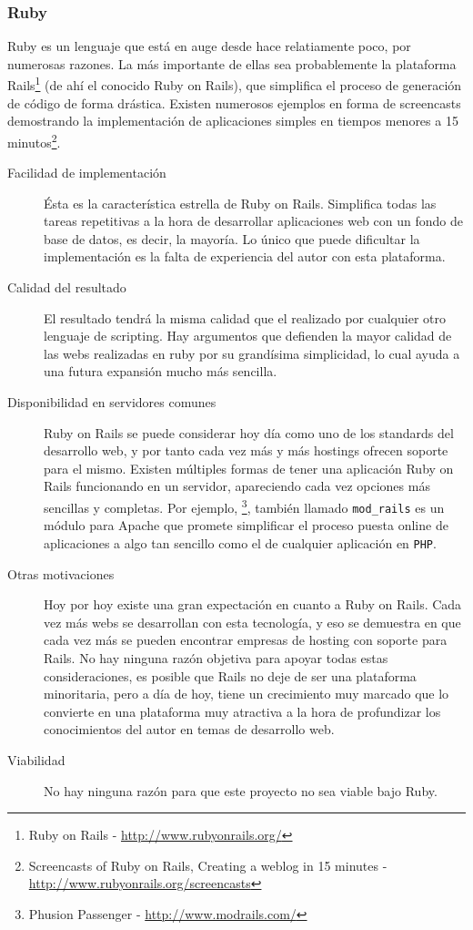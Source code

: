 \subsubsection{Ruby}
Ruby es un lenguaje que está en auge desde hace relatiamente poco, por numerosas razones. La más importante de ellas sea probablemente la plataforma Rails\footnote{Ruby on Rails - \url{http://www.rubyonrails.org/}} (de ahí el conocido Ruby on Rails), que simplifica el proceso de generación de código de forma drástica. Existen numerosos ejemplos en forma de screencasts demostrando la implementación de aplicaciones simples en tiempos menores a 15 minutos\footnote{Screencasts of Ruby on Rails, Creating a weblog in 15 minutes - \url{http://www.rubyonrails.org/screencasts}}.

\begin{description}
	\item[Facilidad de implementación] Ésta es la característica estrella de Ruby on Rails. Simplifica todas las tareas repetitivas a la hora de desarrollar aplicaciones web con un fondo de base de datos, es decir, la mayoría. Lo único que puede dificultar la implementación es la falta de experiencia del autor con esta plataforma.
	\item[Calidad del resultado] El resultado tendrá la misma calidad que el realizado por cualquier otro lenguaje de scripting. Hay argumentos que defienden la mayor calidad de las webs realizadas en ruby por su grandísima simplicidad, lo cual ayuda a una futura expansión mucho más sencilla.
	\item[Disponibilidad en servidores comunes] Ruby on Rails se puede considerar hoy día como uno de los standards del desarrollo web, y por tanto cada vez más y más hostings ofrecen soporte para el mismo. Existen múltiples formas de tener una aplicación Ruby on Rails funcionando en un servidor, apareciendo cada vez opciones más sencillas y completas. Por ejemplo, \footnote{Phusion Passenger - \url{http://www.modrails.com/}}, también llamado \texttt{mod\_rails} es un módulo para Apache que promete simplificar el proceso puesta online de aplicaciones a algo tan sencillo como el de cualquier aplicación en \texttt{PHP}.
	\item[Otras motivaciones] Hoy por hoy existe una gran expectación en cuanto a Ruby on Rails. Cada vez más webs se desarrollan con esta tecnología, y eso se demuestra en que cada vez más se pueden encontrar empresas de hosting con soporte para Rails. No hay ninguna razón objetiva para apoyar todas estas consideraciones, es posible que Rails no deje de ser una plataforma minoritaria, pero a día de hoy, tiene un crecimiento muy marcado que lo convierte en una plataforma muy atractiva a la hora de profundizar los conocimientos del autor en temas de desarrollo web.
	\item[Viabilidad] No hay ninguna razón para que este proyecto no sea viable bajo Ruby.
\end{description}

